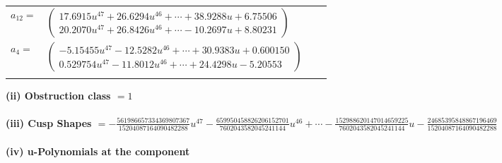 \documentclass[1p]{elsarticle_modified}
\theoremstyle{definition}
\begin{document}
\begin{tabular}{m{7pt} m{180pt} m{7pt} m{180pt} }
\flushright $a_{12}=$&$\begin{pmatrix}17.6915 u^{47}+26.6294 u^{46}+\cdots+38.9288 u+6.75506\\20.2070 u^{47}+26.8426 u^{46}+\cdots-10.2697 u+8.80231\end{pmatrix}$ \\
\flushright $a_{4}=$&$\begin{pmatrix}-5.15455 u^{47}-12.5282 u^{46}+\cdots+30.9383 u+0.600150\\0.529754 u^{47}-11.8012 u^{46}+\cdots+24.4298 u-5.20553\end{pmatrix}$\\&\end{tabular}
\flushleft \textbf{(ii) Obstruction class $= 1$}\\~\\
\flushleft \textbf{(iii) Cusp Shapes $= -\frac{561986657334369807367}{15204087164090482288} u^{47}-\frac{659950458826206152701}{7602043582045241144} u^{46}+\cdots-\frac{152988620147014659225}{7602043582045241144} u-\frac{24685395848867196469}{15204087164090482288}$}\\~\\
\newpage\renewcommand{\arraystretch}{1}
\flushleft \textbf{(iv) u-Polynomials at the component}\newline \\
\end{document}
